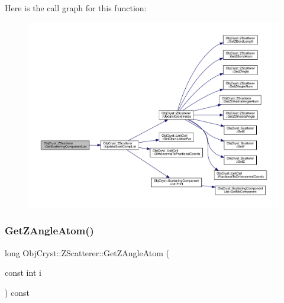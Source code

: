 Here is the call graph for this function\+:
\nopagebreak
\begin{figure}[H]
\begin{center}
\leavevmode
\includegraphics[width=350pt]{class_obj_cryst_1_1_z_scatterer_afebe0638df5f8f8cd3db05f69ed41a21_cgraph}
\end{center}
\end{figure}
\mbox{\label{class_obj_cryst_1_1_z_scatterer_af6ffcf6d863d090c6e72c2749f6c7768}} 
\subsubsection{\texorpdfstring{GetZAngleAtom()}{GetZAngleAtom()}}
{\footnotesize\ttfamily long Obj\+Cryst\+::\+Z\+Scatterer\+::\+Get\+Z\+Angle\+Atom (\begin{DoxyParamCaption}\item[{const int}]{i }\end{DoxyParamCaption}) const}

